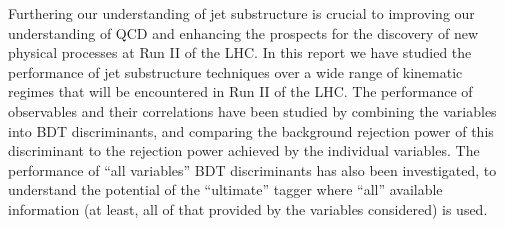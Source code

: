 
Furthering our understanding of jet substructure is crucial to improving our understanding of QCD and enhancing the prospects for the discovery of new physical processes at Run II of the LHC. In this report we have studied the performance of jet substructure techniques over a wide range of kinematic regimes that will be encountered in Run II of the LHC. The performance of observables and their correlations have been studied by combining the variables into BDT discriminants, and comparing the background rejection power of this discriminant to the rejection power achieved by the individual variables. The performance of ``all variables'' BDT discriminants has also been investigated, to understand the potential of the ``ultimate'' tagger where ``all'' available information (at least, all of that provided by the variables considered) is used.

